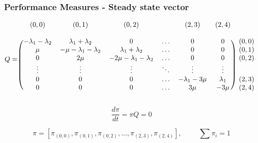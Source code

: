 \begin{frame}
    \frametitle{Performance Measures - Steady state vector}
    
    \tiny
    \begin{equation*}
        Q = 
        \begin{blockarray}{ccccccc}
            (0, 0) & (0, 1) & (0, 2) & & (2, 3) & (2, 4) & \\
            & & & & & & & \\
            \begin{block}{(cccccc)c}
                -\lambda_1 - \lambda_2 & \lambda_1 + \lambda_2 & 0 & \dots & 0 & 0 & (0,0) \\
                \mu & -\mu - \lambda_1 - \lambda_2 & \lambda_1 + \lambda_2 & \dots & 0 & 0 & (0,1) \\
                0 & 2\mu & -2\mu - \lambda_1 - \lambda_2 & \dots & 0 & 0 & (0,2) \\
                \vdots & \vdots & \vdots & \ddots & \vdots & \vdots \\
                0 & 0 & 0 & \dots & -\lambda_1 - 3\mu & \lambda_1 & (2,3) \\
                0 & 0 & 0 & \dots & 3\mu & -3\mu & (2,4) \\
            \end{block}
        \end{blockarray}    
    \end{equation*}

    \normalsize
    \begin{equation*}
        \frac{d \pi}{dt} = \pi Q = 0 
    \end{equation*}

    \begin{equation*}
        \pi = \left[
            \pi_{(0,0)}, \pi_{(0,1)}, \pi_{(0,2)}, \dots, \pi_{(2,3)}, \pi_{(2,4)}
        \right], \hspace{1cm} \sum \pi_i = 1
    \end{equation*}

\end{frame}


